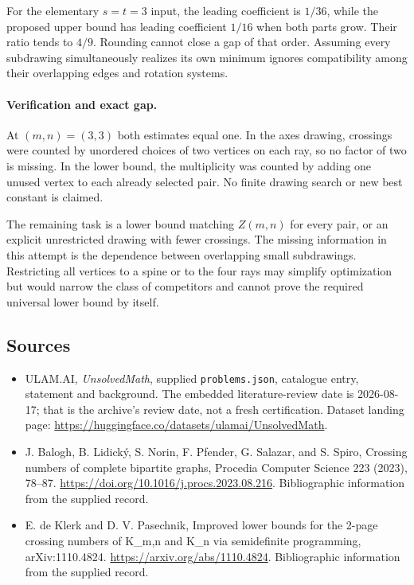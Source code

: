\documentclass[11pt,a4paper]{article}
\begin{document}
For the elementary $s=t=3$ input, the leading coefficient is $1/36$, while the proposed upper bound has leading coefficient $1/16$ when both parts grow. Their ratio tends to $4/9$. Rounding cannot close a gap of that order. Assuming every subdrawing simultaneously realizes its own minimum ignores compatibility among their overlapping edges and rotation systems.

\paragraph{Verification and exact gap.}
At $(m,n)=(3,3)$ both estimates equal one. In the axes drawing, crossings were counted by unordered choices of two vertices on each ray, so no factor of two is missing. In the lower bound, the multiplicity was counted by adding one unused vertex to each already selected pair. No finite drawing search or new best constant is claimed.

The remaining task is a lower bound matching $Z(m,n)$ for every pair, or an explicit unrestricted drawing with fewer crossings. The missing information in this attempt is the dependence between overlapping small subdrawings. Restricting all vertices to a spine or to the four rays may simplify optimization but would narrow the class of competitors and cannot prove the required universal lower bound by itself.

\subsection{Sources}

{\small

\begin{itemize}

\item[\hypertarget{source:statement:1}{S1}] ULAM.AI, \emph{UnsolvedMath}, supplied \texttt{problems.json}, catalogue entry, statement and background. The embedded literature-review date is 2026-08-17; that is the archive’s review date, not a fresh certification. Dataset landing page: \url{https://huggingface.co/datasets/ulamai/UnsolvedMath}.

\item[\hypertarget{source:statement:2}{S2}] J. Balogh, B. Lidický, S. Norin, F. Pfender, G. Salazar, and S. Spiro, Crossing numbers of complete bipartite graphs, Procedia Computer Science 223 (2023), 78–87. \url{https://doi.org/10.1016/j.procs.2023.08.216}. Bibliographic information from the supplied record.

\item[\hypertarget{source:statement:3}{S3}] E. de Klerk and D. V. Pasechnik, Improved lower bounds for the 2-page crossing numbers of K\_{m,n} and K\_n via semidefinite programming, arXiv:1110.4824. \url{https://arxiv.org/abs/1110.4824}. Bibliographic information from the supplied record.

\end{itemize}

}

\label{end:statement}
\end{document}
